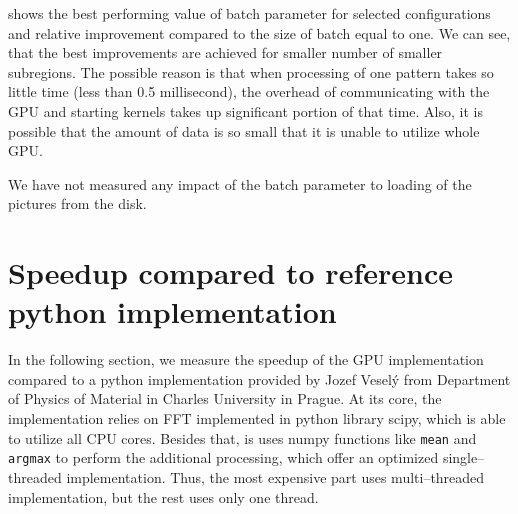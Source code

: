  shows the best performing value of batch parameter for selected configurations and relative improvement compared to the size of batch equal to one. We can see, that the best improvements are achieved for smaller number of smaller subregions. The possible reason is that when processing of one pattern takes so little time (less than 0.5 millisecond), the overhead of communicating with the GPU and starting kernels takes up significant portion of that time. Also, it is possible that the amount of data is so small that it is unable to utilize whole GPU.

We have not measured any impact of the batch parameter to loading of the pictures from the disk.

\section{Speedup compared to reference python implementation}

In the following section, we measure the speedup of the GPU implementation compared to a python implementation provided by Jozef Veselý from Department of Physics of Material in Charles University in Prague. At its core, the implementation relies on FFT implemented in python library scipy, which is able to utilize all CPU cores. Besides that, is uses numpy functions like \texttt{mean} and \texttt{argmax} to perform the additional processing, which offer an optimized single--threaded implementation. Thus, the most expensive part uses multi--threaded implementation, but the rest uses only one thread.





